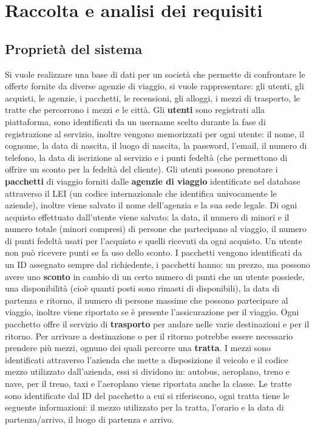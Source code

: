 \section{Raccolta e analisi dei requisiti}
\subsection{Proprietà del sistema}
%
%
Si vuole realizzare una base di dati per un società che permette di confrontare le offerte fornite da diverse agenzie di viaggio, si vuole rappresentare: gli utenti, gli acquisti, le agenzie, i pacchetti, le recensioni, gli alloggi, i mezzi di trasporto, le tratte che percorrono i mezzi e le città.
%
%
Gli \textbf{utenti} sono registrati alla piattaforma, sono identificati da un username scelto durante la fase di registrazione al servizio, inoltre vengono memorizzati per ogni utente: il nome, il cognome, la data di nascita, il luogo di nascita, la password, l'email, il numero di telefono, la data di iscrizione al servizio e i punti fedeltà (che permettono di offrire un sconto per la fedeltà del cliente).
%
%
Gli utenti possono prenotare i \textbf{pacchetti} di viaggio forniti dalle \textbf{agenzie di viaggio} identificate nel database attraverso il LEI (un codice internazionale che identifica univocamente le aziende), inoltre viene salvato il nome dell'agenzia e la sua sede legale. Di ogni acquisto effettuato dall'utente viene salvato: la data, il numero di minori e il numero totale (minori compresi) di persone che partecipano al viaggio, il numero di punti fedeltà usati per l'acquisto e quelli ricevuti da ogni acquisto. Un utente non può ricevere punti se fa uso dello sconto.
%
%
I pacchetti vengono identificati da un ID assegnato sempre dal richiedente, i pacchetti hanno: un prezzo, ma possono avere uno \textbf{sconto} in cambio di un certo numero di punti che un utente possiede, una disponibilità (cioè quanti posti sono rimasti di disponibili), la data di partenza e ritorno, il numero di persone massime che possono partecipare al viaggio, inoltre viene riportato se è presente l'assicurazione per il viaggio.
%
%
Ogni pacchetto offre il servizio di \textbf{trasporto} per andare nelle varie destinazioni e per il ritorno. Per arrivare a destinazione o per il ritorno potrebbe essere necessario prendere più mezzi, ognuno dei quali percorre una \textbf{tratta}. I mezzi sono identificati attraverso l'azienda che mette a disposizione il veicolo e il codice mezzo utilizzato dall'azienda, essi si dividono in: autobus, aeroplano, treno e nave, per il treno, taxi e l'aeroplano viene riportata anche la classe. Le tratte sono identificate dal ID del pacchetto a cui si riferiscono, ogni tratta tiene le seguente informazioni: il mezzo utilizzato per la tratta, l'orario e la data di partenza/arrivo, il luogo di partenza e arrivo.
